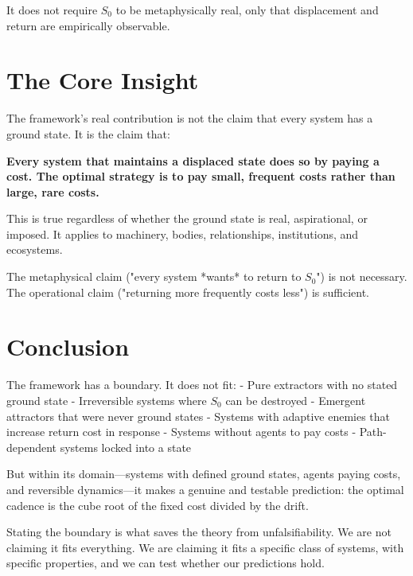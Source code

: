 \documentclass[12pt]{article}
\begin{document}
It does not require $S_0$ to be metaphysically real, only that displacement and return are empirically observable.

\section{The Core Insight}

The framework's real contribution is not the claim that every system has a ground state. It is the claim that:

\textbf{Every system that maintains a displaced state does so by paying a cost. The optimal strategy is to pay small, frequent costs rather than large, rare costs.}

This is true regardless of whether the ground state is real, aspirational, or imposed. It applies to machinery, bodies, relationships, institutions, and ecosystems.

The metaphysical claim ("every system *wants* to return to $S_0$") is not necessary. The operational claim ("returning more frequently costs less") is sufficient.

\section{Conclusion}

The framework has a boundary. It does not fit:
- Pure extractors with no stated ground state
- Irreversible systems where $S_0$ can be destroyed
- Emergent attractors that were never ground states
- Systems with adaptive enemies that increase return cost in response
- Systems without agents to pay costs
- Path-dependent systems locked into a state

But within its domain—systems with defined ground states, agents paying costs, and reversible dynamics—it makes a genuine and testable prediction: the optimal cadence is the cube root of the fixed cost divided by the drift.

Stating the boundary is what saves the theory from unfalsifiability. We are not claiming it fits everything. We are claiming it fits a specific class of systems, with specific properties, and we can test whether our predictions hold.
\end{document}
